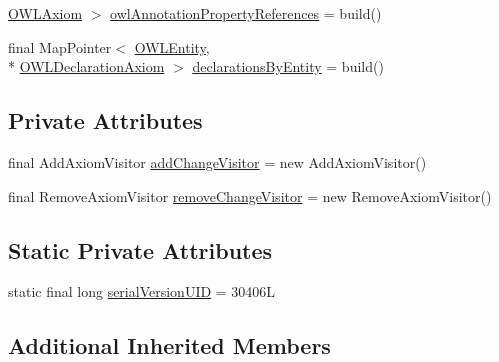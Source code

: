 \begin{DoxyCompactItemize}
\hyperlink{interfaceorg_1_1semanticweb_1_1owlapi_1_1model_1_1_o_w_l_axiom}{O\-W\-L\-Axiom} $>$ \hyperlink{classuk_1_1ac_1_1manchester_1_1cs_1_1owl_1_1owlapi_1_1_internals_impl_ae686f2072b25bdd000a2ff3e738f10cb}{owl\-Annotation\-Property\-References} = build()
\item 
final Map\-Pointer$<$ \hyperlink{interfaceorg_1_1semanticweb_1_1owlapi_1_1model_1_1_o_w_l_entity}{O\-W\-L\-Entity}, \\*
\hyperlink{interfaceorg_1_1semanticweb_1_1owlapi_1_1model_1_1_o_w_l_declaration_axiom}{O\-W\-L\-Declaration\-Axiom} $>$ \hyperlink{classuk_1_1ac_1_1manchester_1_1cs_1_1owl_1_1owlapi_1_1_internals_impl_a08912e8474be19636c7971695540bfc1}{declarations\-By\-Entity} = build()
\end{DoxyCompactItemize}
\subsection*{Private Attributes}
\begin{DoxyCompactItemize}
\item 
final Add\-Axiom\-Visitor \hyperlink{classuk_1_1ac_1_1manchester_1_1cs_1_1owl_1_1owlapi_1_1_internals_impl_a45c128f0ae34cb320c355233fed47efa}{add\-Change\-Visitor} = new Add\-Axiom\-Visitor()
\item 
final Remove\-Axiom\-Visitor \hyperlink{classuk_1_1ac_1_1manchester_1_1cs_1_1owl_1_1owlapi_1_1_internals_impl_a26feeb9d88883c6ab83e3f71248ea7e7}{remove\-Change\-Visitor} = new Remove\-Axiom\-Visitor()
\end{DoxyCompactItemize}
\subsection*{Static Private Attributes}
\begin{DoxyCompactItemize}
\item 
static final long \hyperlink{classuk_1_1ac_1_1manchester_1_1cs_1_1owl_1_1owlapi_1_1_internals_impl_a115b5916b494e74c7258fe707e670704}{serial\-Version\-U\-I\-D} = 30406\-L
\end{DoxyCompactItemize}
\subsection*{Additional Inherited Members}



